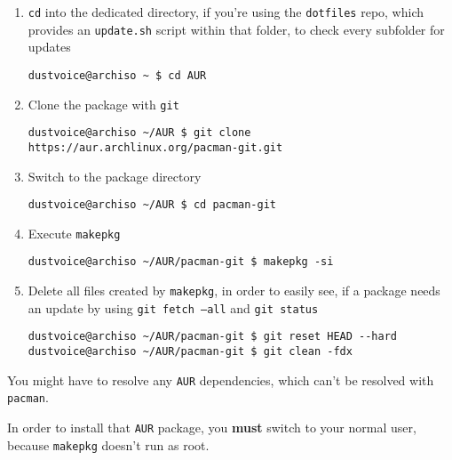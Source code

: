 \documentclass[10pt]{dustdoc}
\begin{document}
\begin{enumerate}
    \item \texttt{cd} into the dedicated directory, if you’re using the \texttt{dotfiles} repo, which provides an \texttt{update.sh} script within that folder, to check every subfolder for updates

        \begin{verbatim}
dustvoice@archiso ~ $ cd AUR
        \end{verbatim}

    \item Clone the package with \texttt{git}

        \begin{verbatim}
dustvoice@archiso ~/AUR $ git clone https://aur.archlinux.org/pacman-git.git
        \end{verbatim}

    \item Switch to the package directory

        \begin{verbatim}
dustvoice@archiso ~/AUR $ cd pacman-git
        \end{verbatim}

    \item Execute \texttt{makepkg}

        \begin{verbatim}
dustvoice@archiso ~/AUR/pacman-git $ makepkg -si
        \end{verbatim}

    \item Delete all files created by \texttt{makepkg}, in order to easily see, if a package needs an update by using \texttt{git fetch --all} and \texttt{git status}

        \begin{verbatim}
dustvoice@archiso ~/AUR/pacman-git $ git reset HEAD --hard
dustvoice@archiso ~/AUR/pacman-git $ git clean -fdx
        \end{verbatim}
\end{enumerate}

\begin{NOTE}
    You might have to resolve any \texttt{AUR} dependencies, which can’t be resolved with \texttt{pacman}.
\end{NOTE}

\begin{WARNING}
    In order to install that \texttt{AUR} package, you \textbf{must} switch to your normal user, because \texttt{makepkg} doesn’t run as root.
\end{WARNING}
\end{document}
